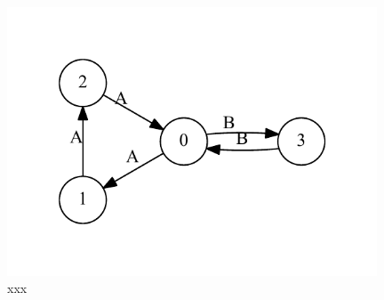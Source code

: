 \documentclass{sig-alternate} %
\begin{document}
\begin{figure}[h]
    \begin{center}
        \includegraphics[width=11cm]{dot/input.pdf}
        \caption{xxx}
        \label{pic1}        
    \end{center}
\end{figure}
\end{document}
